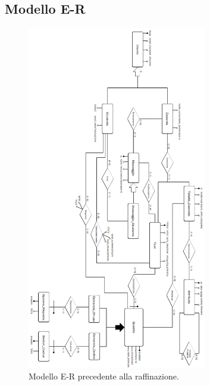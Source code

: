 \documentclass{article}
\begin{document}
\subsection{Modello E-R}
\begin{figure}[H]
    \includegraphics[width=0.7\textwidth]{foto1.png}
    \caption{Modello E-R precedente alla raffinazione.}
\end{figure}
\end{document}
